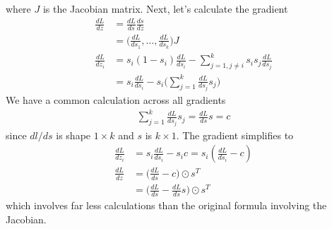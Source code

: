 \documentclass[../../deep_learning_notes.tex]{subfiles}
\begin{document}
where $J$ is the Jacobian matrix. Next, let's calculate the gradient
\begin{align*}
    \frac{dL}{dz} &= \frac{dL}{ds} \frac{ds}{dz}\\
    &= \bigg( \frac{dL}{ds_{1}}, \ldots, \frac{dL}{ds_{k}} \bigg) J\\
    \frac{dL}{dz_{i}} &= s_{i}(1-s_{i})\frac{dL}{ds_{i}} - \sum_{j=1, j\neq i}^{k}s_{i}s_{j}\frac{dL}{ds_{j}}\\
    &= s_{i}\frac{dL}{ds_{i}} - s_{i} \bigg( \sum_{j=1}^{k}\frac{dL}{ds_{j}}s_{j} \bigg)
\end{align*}
We have a common calculation across all gradients
\begin{align*}
    \sum_{j=1}^{k}\frac{dL}{ds_{j}}s_{j} = \frac{dL}{ds}s = c
\end{align*}
since $dl/ds$ is shape $1 \times k$ and $s$ is $k \times 1$. The gradient simplifies to
\begin{align*}
    \frac{dL}{dz_{i}} &= s_{i}\frac{dL}{ds_{i}} - s_{i}c = s_{i}(\frac{dL}{ds_{i}} - c)\\
    \frac{dL}{dz} &= \bigg(\frac{dL}{ds} - c \bigg) \odot s^{T}\\
    &= \bigg( \frac{dL}{ds} - \frac{dL}{ds}s \bigg) \odot s^{T}
\end{align*}
which involves far less calculations than the original formula involving the Jacobian.
\end{document}
